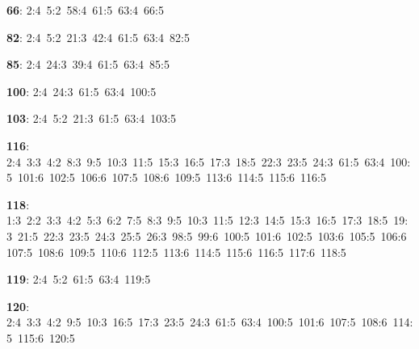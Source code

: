 \noindent \textbf{66}: 2:4\allowbreak\ 5:2\allowbreak\ 58:4\allowbreak\ 61:5\allowbreak\ 63:4\allowbreak\ 66:5\par
\noindent \textbf{82}: 2:4\allowbreak\ 5:2\allowbreak\ 21:3\allowbreak\ 42:4\allowbreak\ 61:5\allowbreak\ 63:4\allowbreak\ 82:5\par
\noindent \textbf{85}: 2:4\allowbreak\ 24:3\allowbreak\ 39:4\allowbreak\ 61:5\allowbreak\ 63:4\allowbreak\ 85:5\par
\noindent \textbf{100}: 2:4\allowbreak\ 24:3\allowbreak\ 61:5\allowbreak\ 63:4\allowbreak\ 100:5\par
\noindent \textbf{103}: 2:4\allowbreak\ 5:2\allowbreak\ 21:3\allowbreak\ 61:5\allowbreak\ 63:4\allowbreak\ 103:5\par
\noindent \textbf{116}: 2:4\allowbreak\ 3:3\allowbreak\ 4:2\allowbreak\ 8:3\allowbreak\ 9:5\allowbreak\ 10:3\allowbreak\ 11:5\allowbreak\ 15:3\allowbreak\ 16:5\allowbreak\ 17:3\allowbreak\ 18:5\allowbreak\ 22:3\allowbreak\ 23:5\allowbreak\ 24:3\allowbreak\ 61:5\allowbreak\ 63:4\allowbreak\ 100:5\allowbreak\ 101:6\allowbreak\ 102:5\allowbreak\ 106:6\allowbreak\ 107:5\allowbreak\ 108:6\allowbreak\ 109:5\allowbreak\ 113:6\allowbreak\ 114:5\allowbreak\ 115:6\allowbreak\ 116:5\par
\noindent \textbf{118}: 1:3\allowbreak\ 2:2\allowbreak\ 3:3\allowbreak\ 4:2\allowbreak\ 5:3\allowbreak\ 6:2\allowbreak\ 7:5\allowbreak\ 8:3\allowbreak\ 9:5\allowbreak\ 10:3\allowbreak\ 11:5\allowbreak\ 12:3\allowbreak\ 14:5\allowbreak\ 15:3\allowbreak\ 16:5\allowbreak\ 17:3\allowbreak\ 18:5\allowbreak\ 19:3\allowbreak\ 21:5\allowbreak\ 22:3\allowbreak\ 23:5\allowbreak\ 24:3\allowbreak\ 25:5\allowbreak\ 26:3\allowbreak\ 98:5\allowbreak\ 99:6\allowbreak\ 100:5\allowbreak\ 101:6\allowbreak\ 102:5\allowbreak\ 103:6\allowbreak\ 105:5\allowbreak\ 106:6\allowbreak\ 107:5\allowbreak\ 108:6\allowbreak\ 109:5\allowbreak\ 110:6\allowbreak\ 112:5\allowbreak\ 113:6\allowbreak\ 114:5\allowbreak\ 115:6\allowbreak\ 116:5\allowbreak\ 117:6\allowbreak\ 118:5\par
\noindent \textbf{119}: 2:4\allowbreak\ 5:2\allowbreak\ 61:5\allowbreak\ 63:4\allowbreak\ 119:5\par
\noindent \textbf{120}: 2:4\allowbreak\ 3:3\allowbreak\ 4:2\allowbreak\ 9:5\allowbreak\ 10:3\allowbreak\ 16:5\allowbreak\ 17:3\allowbreak\ 23:5\allowbreak\ 24:3\allowbreak\ 61:5\allowbreak\ 63:4\allowbreak\ 100:5\allowbreak\ 101:6\allowbreak\ 107:5\allowbreak\ 108:6\allowbreak\ 114:5\allowbreak\ 115:6\allowbreak\ 120:5\par
